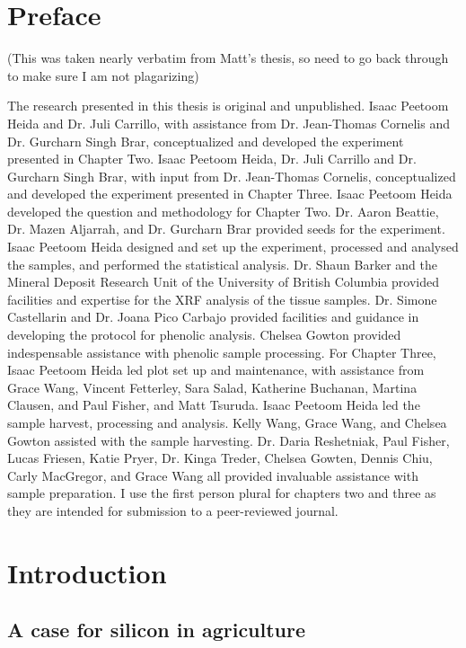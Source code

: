 \documentclass[12pt, letterpaper, ]{report}
\begin{document}
\chapter{Preface}

(This was taken nearly verbatim from Matt's thesis, so need to go back through to make sure I am not plagarizing)

The research presented in this thesis is original and unpublished. Isaac Peetoom Heida and Dr. Juli Carrillo, with assistance from Dr. Jean-Thomas Cornelis and Dr. Gurcharn Singh Brar, conceptualized and developed the experiment presented in Chapter Two. Isaac Peetoom Heida, Dr. Juli Carrillo and Dr. Gurcharn Singh Brar, with input from Dr. Jean-Thomas Cornelis, conceptualized and developed the experiment presented in Chapter Three.
Isaac Peetoom Heida developed the question and methodology for Chapter Two. Dr. Aaron Beattie, Dr. Mazen Aljarrah, and Dr. Gurcharn Brar provided seeds for the experiment. Isaac Peetoom Heida designed and set up the experiment, processed and analysed the samples, and performed the statistical analysis. Dr. Shaun Barker and the Mineral Deposit Research Unit of the University of British Columbia provided facilities and expertise for the XRF analysis of the tissue samples. Dr. Simone Castellarin and Dr. Joana Pico Carbajo provided facilities and guidance in developing the protocol for phenolic analysis. Chelsea Gowton provided indespensable assistance with phenolic sample processing. 
For Chapter Three, Isaac Peetoom Heida led plot set up and maintenance, with assistance from Grace Wang, Vincent Fetterley, Sara Salad, Katherine Buchanan, Martina Clausen, and Paul Fisher, and Matt Tsuruda. Isaac Peetoom Heida led the sample harvest, processing and analysis. Kelly Wang, Grace Wang, and Chelsea Gowton assisted with the sample harvesting. Dr. Daria Reshetniak, Paul Fisher, Lucas Friesen, Katie Pryer, Dr. Kinga Treder, Chelsea Gowten, Dennis Chiu, Carly MacGregor, and Grace Wang all provided invaluable assistance with sample preparation. 
I use the first person plural for chapters two and three as they are intended for submission to a peer-reviewed journal. 

\chapter{Introduction}


\section{A case for silicon in agriculture}
\end{document}
